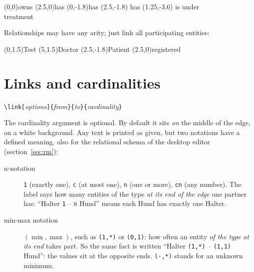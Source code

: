 \documentclass[10pt,a4paper]{article}
\newcommand\meta[1]{\textlangle\textit{#1}\textrangle}
\begin{document}
\begin{example}
\begin{erdiagram}
  (0,0){owns}
  (2.5,0){has}
  (0,-1.8){has}
  (2.5,-1.8)
     {has}
  (1.25,-3.6)
     {is under\\treatment}
\end{erdiagram}
\end{example}

Relationships may have any arity; just link all participating entities:

\begin{example}
\begin{erdiagram}
  (0,1.5){Test}
  (5,1.5){Doctor}
  (2.5,-1.8){Patient}
  (2.5,0){registered}
\end{erdiagram}
\end{example}

\section{Links and cardinalities}\label{sec:links}

\begin{center}
\verb|\link[|\meta{options}\verb|]{|\meta{from}\verb|}{|\meta{to}\verb|}{|\meta{cardinality}\verb|}|
\end{center}

The cardinality argument is optional. By default it sits \emph{on} the
middle of the edge, on a white background. Any text is printed as given, but two
notations have a defined meaning, also for the relational schema of the desktop
editor (section~\ref{sec:rm}):

\begin{description}
\item[n-notation] \texttt{1} (exactly one), \texttt{c} (at most one), \texttt{n}
  (one or more), \texttt{cn} (any number). The label says how many entities of
  the type \emph{at its end of the edge} one partner has: ``Halter \texttt{1} --
  \texttt{n} Hund'' means each Hund has exactly one Halter.
\item[min-max notation] $(\min,\max)$, such as \texttt{(1,*)} or \texttt{(0,1)}: how
  often an entity \emph{of the type at its end} takes part. So the same fact is
  written ``Halter \texttt{(1,*)} -- \texttt{(1,1)} Hund'': the values sit at the opposite ends.
  \texttt{(·,*)} stands for an unknown minimum.
\end{description}
\end{document}
